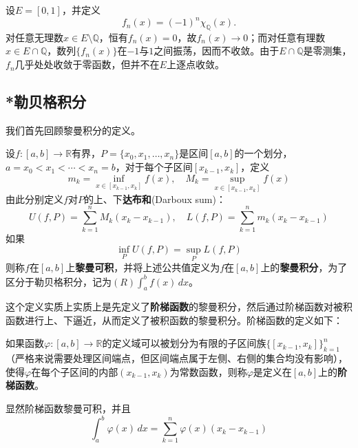 \begin{example}
    设$E=[0,1]$，并定义
    \[f_n(x)=(-1)^n\chi_{\mathbb{Q}}(x).
    \]
    对任意无理数$x\in E\setminus\mathbb{Q}$，恒有$f_n(x)=0$，故$f_n(x)\to0$；而对任意有理数$x\in E\cap\mathbb{Q}$，数列$\{f_n(x)\}$在$-1$与$1$之间振荡，因而不收敛。由于$E\cap\mathbb{Q}$是零测集，$f_n$几乎处处收敛于零函数，但并不在$E$上逐点收敛。%
\end{example}
%
%
%

\subsection{*勒贝格积分}\label{sub:integral}

我们首先回顾黎曼积分的定义。

\begin{definition}[黎曼积分]
    设$f:[a,b]\to\mathbb{R}$有界，$P=\{x_0,x_1,\dots,x_n\}$是区间$[a,b]$的一个划分，$a=x_0<x_1<\cdots <x_n=b$，对于每个子区间$[x_{k-1},x_k]$，定义
    \[m_k=\inf_{x\in [x_{k-1},x_k]}f(x),\quad M_k=\sup_{x\in [x_{k-1},x_k]}f(x)\]
    由此分别定义$f$对$P$的上、下\textbf{达布和}(Darboux sum)：
    \[U(f,P)=\sum_{k=1}^{n}M_k(x_k-x_{k-1}),\quad L(f,P)=\sum_{k=1}^{n}m_k(x_k-x_{k-1})\]
    如果
    \[\inf_{P}U(f,P)=\sup_{P}L(f,P)\]
    则称$f$在$[a,b]$上\textbf{黎曼可积}，并将上述公共值定义为$f$在$[a,b]$上的\textbf{黎曼积分}，为了区分于勒贝格积分，记为$(R)\int_{a}^{b}f(x)\,dx$。
\end{definition}

这个定义实质上实质上是先定义了\textbf{阶梯函数}的黎曼积分，然后通过阶梯函数对被积函数进行上、下逼近，从而定义了被积函数的黎曼积分。阶梯函数的定义如下：

\begin{definition}[阶梯函数]
    如果函数$\varphi:[a,b]\to\mathbb{R}$的定义域可以被划分为有限的子区间族$\{[x_{k-1},x_k]\}_{k=1}^{n}$（严格来说需要处理区间端点，但区间端点属于左侧、右侧的集合均没有影响），使得$\varphi$在每个子区间的内部$(x_{k-1},x_k)$为常数函数，则称$\varphi$是定义在$[a,b]$上的\textbf{阶梯函数}。

    显然阶梯函数黎曼可积，并且
    $$\int_{a}^{b}\varphi(x)\,dx=\sum_{k=1}^{n}\varphi(x)(x_k-x_{k-1})$$
\end{definition}

